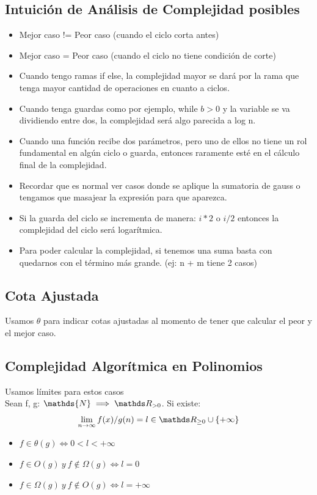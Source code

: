 \documentclass[10pt,a4paper]{article}
\begin{document}
\subsection*{Intuición de Análisis de Complejidad posibles}
\begin{itemize}
    \item Mejor caso != Peor caso (cuando el ciclo corta antes)
    \item Mejor caso = Peor caso (cuando el ciclo no tiene condición de corte)
    \item Cuando tengo ramas if else, la complejidad mayor se dará por la rama que tenga mayor cantidad de operaciones en cuanto a ciclos.
    \item Cuando tenga guardas como por ejemplo, while $b>0$ y la variable se va dividiendo entre dos, la complejidad será algo parecida a log n.
    \item Cuando una función recibe dos parámetros, pero uno de ellos no tiene un rol fundamental en algún ciclo o guarda, entonces raramente esté en el cálculo final de la complejidad.
    \item Recordar que es normal ver casos donde se aplique la sumatoria de gauss o tengamos que masajear la expresión para que aparezca.
    \item Si la guarda del ciclo se incrementa de manera: $i*2$ o $i/2$ entonces la complejidad del ciclo será logarítmica.
    \item Para poder calcular la complejidad, si tenemos una suma basta con quedarnos con el término más grande. (ej: n + m tiene 2 casos)
\end{itemize}

\subsection*{Cota Ajustada}
Usamos \(\theta\) para indicar cotas ajustadas al momento de tener que calcular el peor y el mejor caso.
\subsection*{Complejidad Algorítmica en Polinomios}
Usamos límites para estos casos \\

Sean f, g: \(\mathds{N} \implies \float_{>0}\). Si existe:
\[ \lim_{n\to\infty} f(x)/g(n) = l \in \float_{\ge 0} \cup \{ +\infty \} \]
\begin{itemize}
    \item \(f \in \theta(g) \iff 0<l<+\infty\)
    \item \(f \in O(g) \ y \ f \notin \Omega(g) \iff l = 0\)
    \item \(f \in \Omega(g) \ y \ f \notin O(g) \iff l = +\infty\)
\end{itemize}
\end{document}
